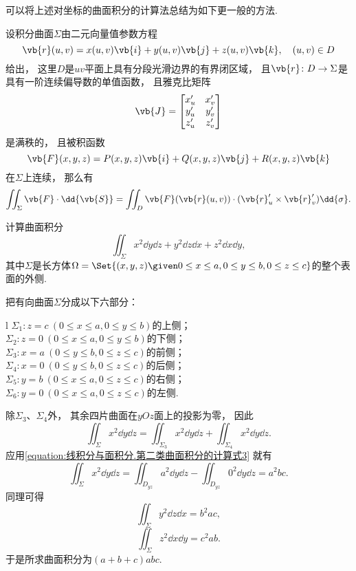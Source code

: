 可以将上述对坐标的曲面积分的计算法总结为如下更一般的方法.
\begin{theorem}
设积分曲面\(\Sigma\)由二元向量值参数方程\[
	\vb{r}(u,v) = x(u,v) \vb{i} + y(u,v) \vb{j} + z(u,v) \vb{k},
	\quad (u,v) \in D
\]给出，
这里\(D\)是\(uv\)平面上具有分段光滑边界的有界闭区域，
且\(\vb{r}\colon D \to \Sigma\)是具有一阶连续偏导数的单值函数，
且雅克比矩阵\[
	\vb{J} = \begin{bmatrix}
		x'_u & x'_v \\
		y'_u & y'_v \\
		z'_u & z'_v
	\end{bmatrix}
\]是满秩的，
且被积函数\[
	\vb{F}(x,y,z) = P(x,y,z) \vb{i} + Q(x,y,z) \vb{j} + R(x,y,z) \vb{k}
\]在\(\Sigma\)上连续，
那么有\begin{equation}
	\iint_\Sigma \vb{F} \cdot \dd{\vb{S}}
	= \iint_D \vb{F}(\vb{r}(u,v)) \cdot (\vb{r}'_u \times \vb{r}'_v) \dd{\sigma}.
\end{equation}
\end{theorem}

\begin{example}
计算曲面积分\[
	\iint_\Sigma x^2 \dd{y}\dd{z} + y^2 \dd{z}\dd{x} + z^2 \dd{x}\dd{y},
\]
其中\(\Sigma\)是长方体\(\Omega = \Set{
	(x,y,z)
	\given
	0 \leq x \leq a,
	0 \leq y \leq b,
	0 \leq z \leq c
}\)的整个表面的外侧.
\begin{solution}
把有向曲面\(\Sigma\)分成以下六部分：
\begin{center}
	\begin{tblr}{l}
		\(\Sigma_1: z=c\ (0 \leq x \leq a, 0 \leq y \leq b)\)的上侧； \\
		\(\Sigma_2: z=0\ (0 \leq x \leq a, 0 \leq y \leq b)\)的下侧； \\
		\(\Sigma_3: x=a\ (0 \leq y \leq b, 0 \leq z \leq c)\)的前侧； \\
		\(\Sigma_4: x=0\ (0 \leq y \leq b, 0 \leq z \leq c)\)的后侧； \\
		\(\Sigma_5: y=b\ (0 \leq x \leq a, 0 \leq z \leq c)\)的右侧； \\
		\(\Sigma_6: y=0\ (0 \leq x \leq a, 0 \leq z \leq c)\)的左侧. \\
	\end{tblr}
\end{center}
除\(\Sigma_3\)、\(\Sigma_4\)外，
其余四片曲面在\(yOz\)面上的投影为零，
因此\[
	\iint_\Sigma x^2 \dd{y}\dd{z}
	= \iint_{\Sigma_3} x^2 \dd{y}\dd{z}
	+ \iint_{\Sigma_4} x^2 \dd{y}\dd{z}.
\]
应用\cref{equation:线积分与面积分.第二类曲面积分的计算式3} 就有\[
	\iint_\Sigma x^2 \dd{y}\dd{z}
	= \iint_{D_{yz}} a^2 \dd{y}\dd{z}
	- \iint_{D_{yz}} 0^2 \dd{y}\dd{z}
	= a^2 bc.
\]
同理可得\[
	\iint_\Sigma y^2 \dd{z}\dd{x}
	= b^2 ac,
\]\[
	\iint_\Sigma z^2 \dd{x}\dd{y}
	= c^2 ab.
\]
于是所求曲面积分为\((a+b+c) abc\).
\end{solution}
\end{example}

